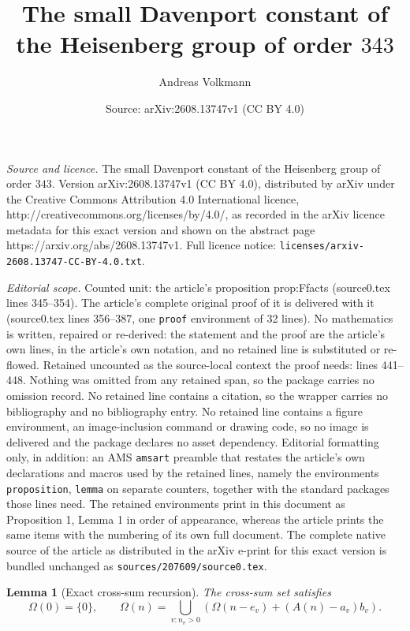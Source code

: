 \documentclass[10pt,a4paper]{amsart}
\title{The small Davenport constant of the Heisenberg group of order $343$}
\author{Andreas Volkmann}
\date{Source: arXiv:2608.13747v1 (CC BY 4.0)}
\newtheorem{lemma}{Lemma}
\newcommand{\Om}{\Omega}
\begin{document}
\maketitle

\noindent\emph{Source and licence.} The small Davenport constant of the Heisenberg group of order $343$. Version arXiv:2608.13747v1 (CC BY 4.0), distributed by arXiv under the Creative Commons Attribution 4.0 International licence, http://creativecommons.org/licenses/by/4.0/, as recorded in the arXiv licence metadata for this exact version and shown on the abstract page https://arxiv.org/abs/2608.13747v1. Full licence notice: \texttt{licenses/arxiv-2608.13747-CC-BY-4.0.txt}.\par\smallskip

\noindent\textit{Editorial scope.} Counted unit: the article's proposition prop:Ffacts (source0.tex lines 345--354). The article's complete original proof of it is delivered with it (source0.tex lines 356--387, one \texttt{proof} environment of 32 lines). No mathematics is written, repaired or re-derived: the statement and the proof are the article's own lines, in the article's own notation, and no retained line is substituted or re-flowed.  Retained uncounted as the source-local context the proof needs: lines 441--448.  Nothing was omitted from any retained span, so the package carries no omission record.  No retained line contains a citation, so the wrapper carries no bibliography and no bibliography entry.  No retained line contains a figure environment, an image-inclusion command or drawing code, so no image is delivered and the package declares no asset dependency.  Editorial formatting only, in addition: an AMS \texttt{amsart} preamble that restates the article's own declarations and macros used by the retained lines, namely the environments \texttt{proposition}, \texttt{lemma} on separate counters, together with the standard packages those lines need.  The retained environments print in this document as Proposition 1, Lemma 1 in order of appearance, whereas the article prints the same items with the numbering of its own full document.  The complete native source of the article as distributed in the arXiv e-print for this exact version is bundled unchanged as \texttt{sources/207609/source0.tex}.
\begin{lemma}[Exact cross-sum recursion]\label{lem:omega-rec}
The cross-sum set satisfies
\[
\Om(0)=\{0\},\qquad
\Om(n)=\bigcup_{v:n_v>0}
 \left(\Om(n-e_v)+(A(n)-a_v)b_v\right).
\]
\end{lemma}
\end{document}
